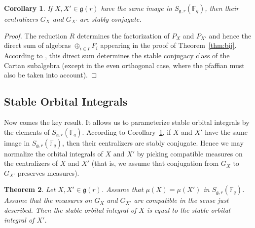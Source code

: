 \documentclass[11pt]{amsart}
\newtheorem{theorem}{Theorem}[section]
\newtheorem{corollary}[theorem]{Corollary}
\theoremstyle{definition}
\theoremstyle{remark}
\numberwithin{equation}{theorem}
\def\f{{\mathbb{F}_q}}
\def\lie#1{{\mathfrak{#1}}}
\begin{document}
\begin{corollary}\label{cor:conjugate}
If $X,X'\in\lie{g}(r)$ have the same image in $S_{\lie{g},r}(\f)$,
then their centralizers $G_X$ and $G_{X'}$ are stably conjugate.
\end{corollary}


\begin{proof}  The reduction $R$ determines the factorization of
$P_X$ and $P_{X'}$ and hence the direct sum of algebras
   $\oplus_{i\in I} F_i$ appearing in the proof of Theorem~\ref{thm:bij}.
According to \cite{WA}, this direct sum determines the stable
conjugacy class of the Cartan subalgebra (except in the even
orthogonal case, where the pfaffian must also be taken into
account).
\end{proof}

\subsection{Stable Orbital Integrals}\label{sec:stable}

Now comes the key result.  It allows us to parameterize stable
orbital integrals by the elements of $S_{\lie{g},r}(\f)$.
According to Corollary~\ref{cor:conjugate}, if $X$ and $X'$ have
the same image in $S_{\lie{g},r}(\f)$, then their centralizers are
stably conjugate. Hence we may normalize the orbital integrals of
$X$ and $X'$ by picking compatible measures on the centralizers of
$X$ and $X'$ (that is, we assume that conjugation from $G_X$ to
$G_{X'}$ preserves measures).

\begin{theorem} \label{thm:stable}
Let $X,X'\in\lie{g}(r)$.  Assume that $\mu(X)=\mu(X')$ in
$S_{\lie{g},r}(\f)$.  Assume that the measures on $G_X$ and
$G_{X'}$ are compatible in the sense just described.  Then the
stable orbital integral of $X$ is equal to the stable orbital
integral of $X'$.
\end{theorem}
\end{document}
